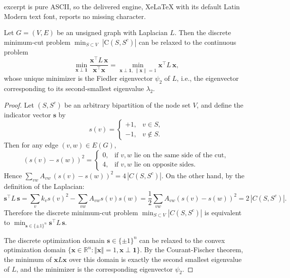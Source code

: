 \documentclass[10pt,a4paper]{amsart}
\newcommand{\R}{\mathbb{R}}
\begin{document}
excerpt is pure ASCII, so the delivered engine, XeLaTeX with its default Latin Modern text font, reports no missing character.
\begin{theorem}  \label{thm:min_cut_Laplacian}
Let $G=(V,E)$ be an unsigned graph with Laplacian $L$. Then the discrete minimum-cut problem  
\(
\min_{S\subset V}\;|\mathrm{C}(S,S^c)|
\)  
can be relaxed to the continuous problem  
\[
\min_{\mathbf{x}\perp\mathbf{1}}
\frac{\mathbf{x}^\top L\,\mathbf{x}}{\mathbf{x}^\top\mathbf{x}}
=
\min_{\mathbf{x}\perp\mathbf{1},\,\|\mathbf{x}\|=1}
\mathbf{x}^\top L\,\mathbf{x},
\]  
whose unique minimizer is the Fiedler eigenvector $\psi_2$ of $L$, i.e., the eigenvector corresponding to its second-smallest eigenvalue $\lambda_2$.
\end{theorem}

\begin{proof}
Let $(S,S^c)$ be an arbitrary bipartition of the node set $V$, and define the indicator vector \(\mathbf{s}\) by
\[
s(v) = 
\begin{cases}
+1,&v\in S,\\
-1,&v\notin S.
\end{cases}
\]
Then for any edge \((v,w)\in E(G)\),  
\[
(s(v) - s(w))^2
=\begin{cases}
0,&\text{if \(v,w\) lie on the same side of the cut},\\
4,&\text{if \(v,w\) lie on opposite sides}.
\end{cases}
\]
Hence
\(
\sum_{vw}A_{vw}\,(s(v) - s(w))^2
=4\,|C(S,S^c)|.
\) On the other hand, by the definition of the Laplacian:
\[
\mathbf{s}^\top L\,\mathbf{s} = \sum_{v}k_{v}s(v)^2 - \sum_{vw}A_{vw}s(v)s(w)
=\frac1{2}\sum_{vw}A_{vw}(s(v) - s(w))^2
=2\,|C(S,S^c)|.
\]
Therefore the discrete minimum-cut problem
\(
\min_{S\subset V}|C(S,S^c)|
\)  is equivalent to \(
\min_{\mathbf{s}\in\{\pm1\}^n}
\mathbf{s}^\top L\,\mathbf{s}.
\)

The discrete optimization domain \(\mathbf{s}\in\{\pm1\}^n\) can be relaxed to the convex optimization domain $\{\mathbf{x}\in\R^n:\Vert\mathbf{x}\Vert=1,\mathbf{x}\perp\mathbf{1}\}$. By the Courant-Fischer theorem, the minimum of \(\mathbf{x}L\mathbf{x}\) over this domain is exactly the second smallest eigenvalue of \(L\), and the minimizer is the corresponding eigenvector \(\psi_2\). 
\end{proof}
\end{document}
